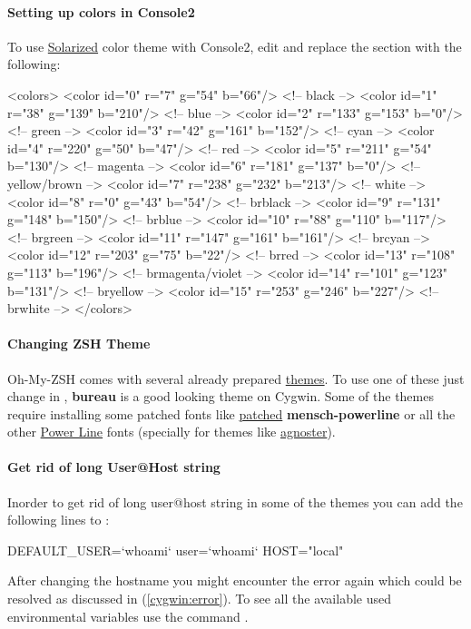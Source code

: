 \paragraph{Setting up colors in Console2}
To use \href{http://ethanschoonover.com/solarized}{Solarized} color theme with Console2, edit  and replace the  section with the following:\newline
\begin{jscode}
<colors>
	<color id="0" r="7" g="54" b="66"/>         <!-- black -->
	<color id="1" r="38" g="139" b="210"/>      <!-- blue -->
	<color id="2" r="133" g="153" b="0"/>       <!-- green -->
	<color id="3" r="42" g="161" b="152"/>      <!-- cyan -->
	<color id="4" r="220" g="50" b="47"/>       <!-- red -->
	<color id="5" r="211" g="54" b="130"/>      <!-- magenta -->
	<color id="6" r="181" g="137" b="0"/>       <!-- yellow/brown -->
	<color id="7" r="238" g="232" b="213"/>     <!-- white -->
	<color id="8" r="0" g="43" b="54"/>         <!-- brblack -->
	<color id="9" r="131" g="148" b="150"/>     <!-- brblue -->
	<color id="10" r="88" g="110" b="117"/>     <!-- brgreen -->
	<color id="11" r="147" g="161" b="161"/>    <!-- brcyan -->
	<color id="12" r="203" g="75" b="22"/>      <!-- brred -->
	<color id="13" r="108" g="113" b="196"/>    <!-- brmagenta/violet -->
	<color id="14" r="101" g="123" b="131"/>    <!-- bryellow -->
	<color id="15" r="253" g="246" b="227"/>    <!-- brwhite  -->
</colors>
\end{jscode}

\paragraph{Changing ZSH Theme}
Oh-My-ZSH comes with several already prepared \href{https://github.com/robbyrussell/oh-my-zsh/wiki/themes}{themes}. To use one of these just change  in , \textbf{bureau} is a good looking theme on Cygwin. Some of the themes require installing some patched fonts like \href{https://gist.github.com/qrush/1595572}{patched} \textbf{mensch-powerline} or all the other \href{https://github.com/powerline/fonts}{Power Line} fonts (specially for themes like \href{https://gist.github.com/agnoster/3712874}{agnoster}).

\paragraph{Get rid of long User@Host string}
Inorder to get rid of long user@host string in some of the themes you can add the following lines to :\newline
\begin{jscode}
DEFAULT_USER=`whoami`
user=`whoami`
HOST="local"
\end{jscode}
\newline
After changing the hostname you might encounter the  error again which could be resolved as discussed in (\ref{cygwin:error}).
To see all the available used environmental variables use the command .

